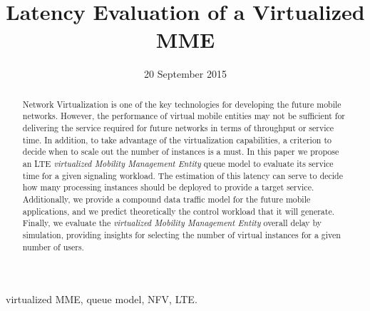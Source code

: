 \documentclass[conference]{IEEEtran}
\begin{document}
\title{Latency Evaluation of a Virtualized MME}
\author{
}
\maketitle






\date{20 September 2015}


\maketitle
\begin{abstract}

 Network Virtualization is one of the key technologies for developing the future mobile networks. However, the performance of virtual mobile entities may not be sufficient for delivering the service required for future networks in terms of throughput or service time. In addition, to take advantage of the virtualization capabilities, a criterion to decide when to scale out the number of instances is a must. 
  In this paper we propose an LTE \emph{virtualized Mobility Management Entity} queue model to evaluate its service time for a given signaling workload. The estimation of this latency can serve to decide how many processing instances should be deployed to provide a target service. Additionally, we provide a compound data traffic model for the future mobile applications, and we predict theoretically the control workload that it will generate. Finally, we evaluate the \emph{virtualized Mobility Management Entity} overall delay by simulation, providing insights for selecting the number of virtual instances for a given number of users.  
\end{abstract}











\begin{IEEEkeywords}
virtualized MME, queue model, NFV, LTE.
\end{IEEEkeywords}
\end{document}
